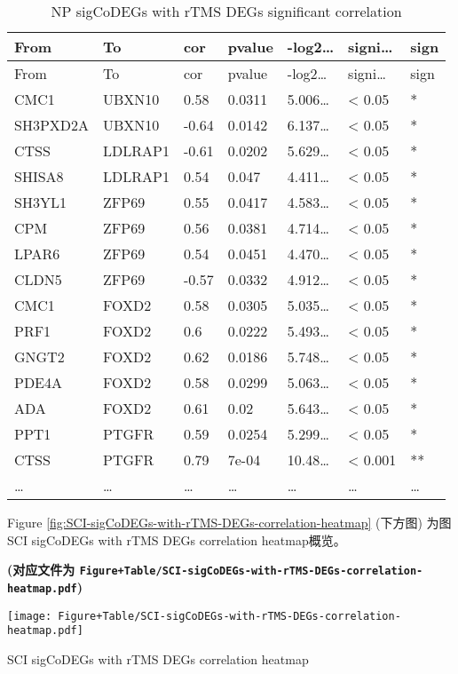 \documentclass[
]{article}
\begin{document}
\begin{longtable}[]{@{}lllllll@{}}
\caption{\label{tab:NP-sigCoDEGs-with-rTMS-DEGs-significant-correlation}NP sigCoDEGs with rTMS DEGs significant correlation}\tabularnewline
\toprule
From & To & cor & pvalue & -log2\ldots{} & signi\ldots{} & sign\tabularnewline
\midrule
\endfirsthead
\toprule
From & To & cor & pvalue & -log2\ldots{} & signi\ldots{} & sign\tabularnewline
\midrule
\endhead
CMC1 & UBXN10 & 0.58 & 0.0311 & 5.006\ldots{} & \textless{} 0.05 & *\tabularnewline
SH3PXD2A & UBXN10 & -0.64 & 0.0142 & 6.137\ldots{} & \textless{} 0.05 & *\tabularnewline
CTSS & LDLRAP1 & -0.61 & 0.0202 & 5.629\ldots{} & \textless{} 0.05 & *\tabularnewline
SHISA8 & LDLRAP1 & 0.54 & 0.047 & 4.411\ldots{} & \textless{} 0.05 & *\tabularnewline
SH3YL1 & ZFP69 & 0.55 & 0.0417 & 4.583\ldots{} & \textless{} 0.05 & *\tabularnewline
CPM & ZFP69 & 0.56 & 0.0381 & 4.714\ldots{} & \textless{} 0.05 & *\tabularnewline
LPAR6 & ZFP69 & 0.54 & 0.0451 & 4.470\ldots{} & \textless{} 0.05 & *\tabularnewline
CLDN5 & ZFP69 & -0.57 & 0.0332 & 4.912\ldots{} & \textless{} 0.05 & *\tabularnewline
CMC1 & FOXD2 & 0.58 & 0.0305 & 5.035\ldots{} & \textless{} 0.05 & *\tabularnewline
PRF1 & FOXD2 & 0.6 & 0.0222 & 5.493\ldots{} & \textless{} 0.05 & *\tabularnewline
GNGT2 & FOXD2 & 0.62 & 0.0186 & 5.748\ldots{} & \textless{} 0.05 & *\tabularnewline
PDE4A & FOXD2 & 0.58 & 0.0299 & 5.063\ldots{} & \textless{} 0.05 & *\tabularnewline
ADA & FOXD2 & 0.61 & 0.02 & 5.643\ldots{} & \textless{} 0.05 & *\tabularnewline
PPT1 & PTGFR & 0.59 & 0.0254 & 5.299\ldots{} & \textless{} 0.05 & *\tabularnewline
CTSS & PTGFR & 0.79 & 7e-04 & 10.48\ldots{} & \textless{} 0.001 & **\tabularnewline
\ldots{} & \ldots{} & \ldots{} & \ldots{} & \ldots{} & \ldots{} & \ldots{}\tabularnewline
\bottomrule
\end{longtable}

Figure \ref{fig:SCI-sigCoDEGs-with-rTMS-DEGs-correlation-heatmap} (下方图) 为图SCI sigCoDEGs with rTMS DEGs correlation heatmap概览。

\textbf{(对应文件为 \texttt{Figure+Table/SCI-sigCoDEGs-with-rTMS-DEGs-correlation-heatmap.pdf})}

\def\@captype{figure}
\begin{center}
\texttt{[image: Figure+Table/SCI-sigCoDEGs-with-rTMS-DEGs-correlation-heatmap.pdf]}
\caption{SCI sigCoDEGs with rTMS DEGs correlation heatmap}\label{fig:SCI-sigCoDEGs-with-rTMS-DEGs-correlation-heatmap}
\end{center}
\end{document}
